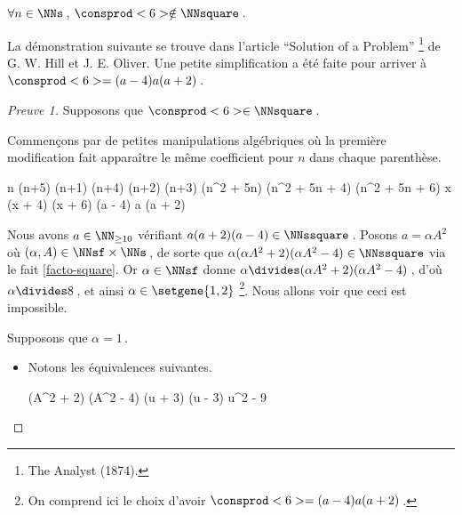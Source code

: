 \begin{fact} \label{case-6}
	 $\forall n \in \NNs$\,, $\consprod<6> \notin \NNsquare$\,.
\end{fact}




La démonstration suivante se trouve dans l'article \enquote{Solution of a Problem}
\footnote{
	The Analyst (1874).
}
de G. W. Hill et J. E. Oliver.
Une petite simplification a été faite pour arriver à $\consprod<6> = (a - 4) a (a + 2)$\,.


\begin{proof}[Preuve 1]%
    Supposons que $\consprod<6> \in \NNsquare$\,.
    
    \smallskip
    
    Commençons par de petites manipulations algébriques où la première modification fait apparaître le même coefficient pour $n$ dans chaque parenthèse.
    
    \medskip
    \begin{stepcalc}[style = sar]
	\explnext{}
		n (n+5) \cdot (n+1) (n+4) \cdot (n+2) (n+3)
	\explnext{}
		(n^2 + 5n) (n^2 + 5n + 4) (n^2 + 5n + 6)
		x (x + 4) (x + 6)
		(a - 4) a (a + 2)
    \end{stepcalc}
  
    \medskip
    Nous avons $a \in \NN_{\geq 10}$ vérifiant $a (a + 2) (a - 4) \in \NNssquare$\,. 
    Posons $a = \alpha A^2$ où $(\alpha, A) \in \NNsf \times \NNs$\,,
    de sorte que $\alpha (\alpha A^2 + 2) (\alpha A^2 - 4) \in \NNssquare$ via le fait \ref{facto-square}.
    Or $\alpha\in \NNsf$ donne $\alpha \divides (\alpha A^2 + 2) (\alpha A^2 - 4)$\,, 
    d'où $\alpha \divides 8$\,, et ainsi $\alpha \in \setgene{1, 2}$
    \footnote{
    	On comprend ici le choix d'avoir $\consprod<6> = (a - 4) a (a + 2)$\,.
    }.
    Nous allons voir que ceci est impossible.
    
    \medskip
    
    Supposons que $\alpha = 1$\,.
    \begin{itemize}
    	\item Notons les équivalences suivantes.
        
        \noindent\kern-6pt%
        \begin{stepcalc}[style=ar*, ope=\iff]
        	(A^2 + 2) (A^2 - 4) \in \NNssquare
        	(u + 3) (u - 3) \in \NNssquare
    	\explnext{}
        	u^2 - 9 \in \NNssquare
        \end{stepcalc}


\end{itemize}
\end{proof}

